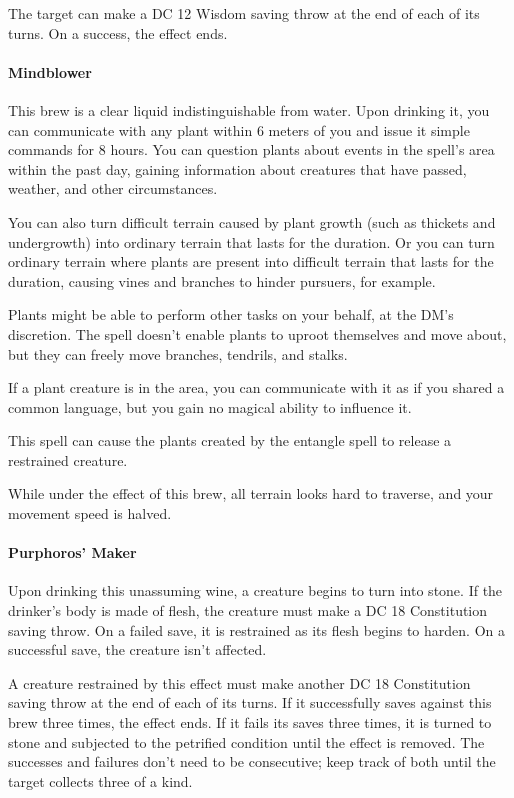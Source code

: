         The target can make a DC 12 Wisdom saving throw at the end of each of its turns.
        On a success, the effect ends.
    \paragraph{Mindblower} %
        This brew is a clear liquid indistinguishable from water.
        Upon drinking it, you can communicate with any plant within 6 meters of you and issue it simple commands for 8 hours.
        You can question plants about events in the spell's area within the past day, gaining information about creatures that have passed, weather, and other circumstances.

        You can also turn difficult terrain caused by plant growth (such as thickets and undergrowth) into ordinary terrain that lasts for the duration.
        Or you can turn ordinary terrain where plants are present into difficult terrain that lasts for the duration, causing vines and branches to hinder pursuers, for example.

        Plants might be able to perform other tasks on your behalf, at the DM's discretion. The spell doesn't enable plants to uproot themselves and move about, but they can freely move branches, tendrils, and stalks.

        If a plant creature is in the area, you can communicate with it as if you shared a common language, but you gain no magical ability to influence it.

        This spell can cause the plants created by the entangle spell to release a restrained creature.

        While under the effect of this brew, all terrain looks hard to traverse, and your movement speed is halved.
    \paragraph{Purphoros' Maker} %
        Upon drinking this unassuming wine, a creature begins to turn into stone.
        If the drinker's body is made of flesh, the creature must make a DC 18 Constitution saving throw.
        On a failed save, it is restrained as its flesh begins to harden.
        On a successful save, the creature isn't affected.

        A creature restrained by this effect must make another DC 18 Constitution saving throw at the end of each of its turns.
        If it successfully saves against this brew three times, the effect ends.
        If it fails its saves three times, it is turned to stone and subjected to the petrified condition until the effect is removed.
        The successes and failures don't need to be consecutive; keep track of both until the target collects three of a kind.

